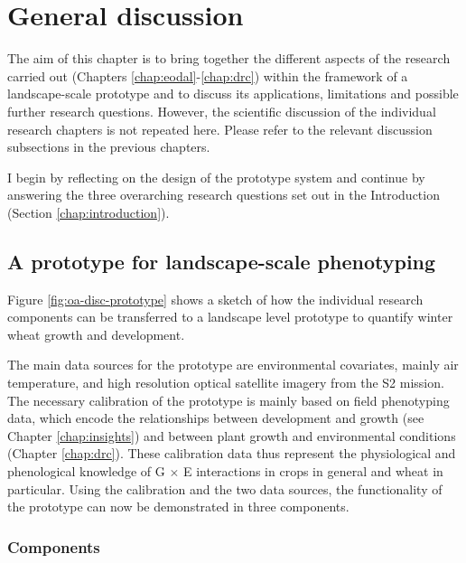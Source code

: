 \chapter{General discussion}
\label{chap:general-discussion}

The aim of this chapter is to bring together the different aspects of the research carried out (Chapters \ref{chap:eodal}-\ref{chap:drc}) within the framework of a landscape-scale prototype and to discuss its applications, limitations and possible further research questions. However, the scientific discussion of the individual research chapters is not repeated here. Please refer to the relevant discussion subsections in the previous chapters.

I begin by reflecting on the design of the prototype system and continue by answering the three overarching research questions set out in the Introduction (Section \ref{chap:introduction}).

\section{A prototype for landscape-scale phenotyping}
Figure \ref{fig:oa-disc-prototype} shows a sketch of how the individual research components can be transferred to a landscape level prototype to quantify winter wheat growth and development.

The main data sources for the prototype are environmental covariates, mainly air temperature, and high resolution optical satellite imagery from the \gls{S2} mission. The necessary calibration of the prototype is mainly based on field phenotyping data, which encode the relationships between development and growth (see Chapter \ref{chap:insights}) and between plant growth and environmental conditions (Chapter \ref{chap:drc}). These calibration data thus represent the physiological and phenological knowledge of G $\times$ E interactions in crops in general and wheat in particular. Using the calibration and the two data sources, the functionality of the prototype can now be demonstrated in three components.

\subsection{Components}

